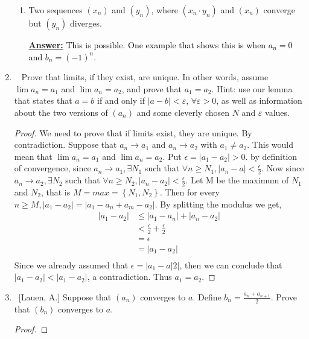 \documentclass[10pt]{article}
\begin{document}
\begin{enumerate}
\begin{enumerate}
	\item  Two sequences $(x_n)$ and $(y_n)$, where $(x_n \cdot y_n)$ and $(x_n)$ converge but $(y_n)$ diverges. 

 \textbf{\underline{Answer:}}
  \textcolor{black}{This is possible.  One example that shows this is when $a_n=0$ and $b_n = (-1)^n$.
  }


  
	
	\end{enumerate}
	

\item  ~ Prove that limits, if they exist, are unique.  In other words, assume $\lim a_n = a_1$ and $\lim a_n = a_2$, and prove that $a_1 = a_2$.  Hint: use our lemma that states that $a = b$ if and only if $|a-b| < \varepsilon$, $\forall \varepsilon > 0$, as well as information about the two versions of $(a_n)$ and some cleverly chosen $N$ and $\varepsilon$ values.
\begin{proof}
We need to prove that if limits exist, they are unique.  By contradiction.  Suppose that $a_n \rightarrow a_1$ and $a_n \rightarrow a_2$ with $a_1 \neq a_2$.  This would mean that $\lim a_n = a_1$ and $\lim a_n = a_2$.  Put $\epsilon = |a_1-a_2| > 0$.  by definition of convergence, since $a_n \rightarrow a_1, \exists N_1$ such that $\forall n \geq N_1, |a_n-a| < \frac{\epsilon}{2}$.   Now since $a_n \rightarrow a_2, \exists N_2$ such that $\forall n \geq N_2, |a_n-a_2|<\frac{\epsilon}{2}$.  Let M be the maximum of $N_1$ and $N_2$, that is $M = max=\left\{N_1,N_2\right\}$.  Then for every $n \geq M, |a_1-a_2| = |a_1-a_n+a_m-a_2|$.  By splitting the modulus we get,
\begin{align*}
\left|a_1-a_2\right| &\leq \left|a_1-a_n\right|+\left|a_n-a_2\right|\\
&< \frac{\epsilon}{2}+\frac{\epsilon}{2}\\
&=\epsilon\\
&=\left|a_1-a_2\right|\\
\end{align*}
Since we already assumed that $\epsilon = |a_1-a|2|$, then we can conclude that $|a_1-a_2|<|a_1-a_2|$, a contradiction.  Thus $a_1=a_2$.
\end{proof}
	
	
\item  ~[Lauen, A.] Suppose that $(a_n)$ converges to $a$.  Define $b_n = \frac{a_n + a_{n+1}}{2}$.  Prove that $(b_n)$ converges to $a$.
\begin{proof}


\end{proof}
\end{enumerate}
\end{document}
